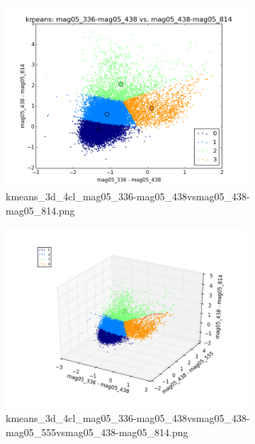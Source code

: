 \documentclass{article}%
\begin{document}
%


\begin{figure}%
\centering%
\includegraphics[width=0.8\textwidth]{kmeans_3d_4cl_mag05_336-mag05_438vsmag05_438-mag05_814.png}%
\caption{kmeans\_3d\_4cl\_mag05\_336{-}mag05\_438vsmag05\_438{-}mag05\_814.png}%
\end{figure}

%


\begin{figure}%
\centering%
\includegraphics[width=0.8\textwidth]{kmeans_3d_4cl_mag05_336-mag05_438vsmag05_438-mag05_555vsmag05_438-mag05_814.png}%
\caption{kmeans\_3d\_4cl\_mag05\_336{-}mag05\_438vsmag05\_438{-}mag05\_555vsmag05\_438{-}mag05\_814.png}%
\end{figure}

%
\end{document}

